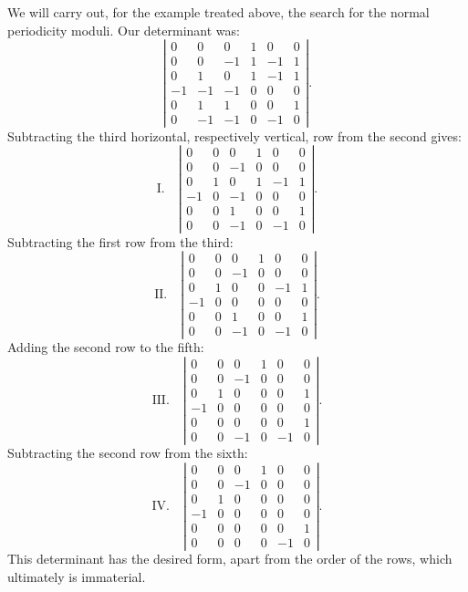 \documentclass[10pt]{article}
\begin{document}
We will carry out, for the example treated above, the search for the normal periodicity moduli. Our determinant was:
\[
\left|\begin{array}{rrrrrr}
0&0&0&1&0&0\\
0&0&-1&1&-1&1\\
0&1&0&1&-1&1\\
-1&-1&-1&0&0&0\\
0&1&1&0&0&1\\
0&-1&-1&0&-1&0
\end{array}\right|.
\]
Subtracting the third horizontal, respectively vertical, row from the second gives:
\[
\mathrm{I.}\quad
\left|\begin{array}{rrrrrr}
0&0&0&1&0&0\\
0&0&-1&0&0&0\\
0&1&0&1&-1&1\\
-1&0&-1&0&0&0\\
0&0&1&0&0&1\\
0&0&-1&0&-1&0
\end{array}\right|.
\]
Subtracting the first row from the third:
\[
\mathrm{II.}\quad
\left|\begin{array}{rrrrrr}
0&0&0&1&0&0\\
0&0&-1&0&0&0\\
0&1&0&0&-1&1\\
-1&0&0&0&0&0\\
0&0&1&0&0&1\\
0&0&-1&0&-1&0
\end{array}\right|.
\]
Adding the second row to the fifth:
\[
\mathrm{III.}\quad
\left|\begin{array}{rrrrrr}
0&0&0&1&0&0\\
0&0&-1&0&0&0\\
0&1&0&0&0&1\\
-1&0&0&0&0&0\\
0&0&0&0&0&1\\
0&0&-1&0&-1&0
\end{array}\right|.
\]
Subtracting the second row from the sixth:
\[
\mathrm{IV.}\quad
\left|\begin{array}{rrrrrr}
0&0&0&1&0&0\\
0&0&-1&0&0&0\\
0&1&0&0&0&0\\
-1&0&0&0&0&0\\
0&0&0&0&0&1\\
0&0&0&0&-1&0
\end{array}\right|.
\]
This determinant has the desired form, apart from the order of the rows, which ultimately is immaterial.
\end{document}

